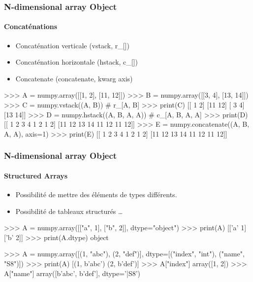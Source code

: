 \begin{frame}[fragile]
\frametitle{N-dimensional array Object}
\framesubtitle{Concaténations}
\begin{itemize}
 \item Concaténation verticale (vstack, r\_[])
 \item Concaténation horizontale (hstack, c\_[])
 \item Concatenate (concatenate, kwarg axis)
\end{itemize}
\begin{pythonConsole}
>>> A = numpy.array([[1, 2], [11, 12]])
>>> B = numpy.array([[3, 4], [13, 14]])
>>> C = numpy.vstack((A, B)) # r\_[A, B]
>>> print(C)
[[ 1  2]
 [11 12]
 [ 3  4]
 [13 14]]
>>> D = numpy.hstack((A, B, A, A)) # c\_[A, B, A, A]
>>> print(D)
[[ 1  2  3  4  1  2  1  2]
 [11 12 13 14 11 12 11 12]]
>>> E = numpy.concatenate((A, B, A, A), axis=1)
>>> print(E)
[[ 1  2  3  4  1  2  1  2]
 [11 12 13 14 11 12 11 12]]
\end{pythonConsole}
\end{frame}
\begin{frame}[fragile]
\frametitle{N-dimensional array Object}
\framesubtitle{Structured Arrays}
\begin{itemize}
 \item Possibilité de mettre des éléments de types différents.  
 \item Possibilité de tableaux structurés \dots
\end{itemize}
\begin{pythonConsole}
>>> A = numpy.array([["a", 1], ["b", 2]], dtype="object")
>>> print(A)
[['a' 1]
 ['b' 2]]
>>> print(A.dtype)
object

>>> A = numpy.array([(1, "abc"), (2, "def")], dtype=[("index", "int"), 
	("name", "S8")])                       
>>> print(A)              
[(1, b'abc') (2, b'def')]
>>> A["index"]
array([1, 2])    
>>> A["name"]                   
array([b'abc', b'def'], 
      dtype='|S8')
\end{pythonConsole}
\end{frame}
